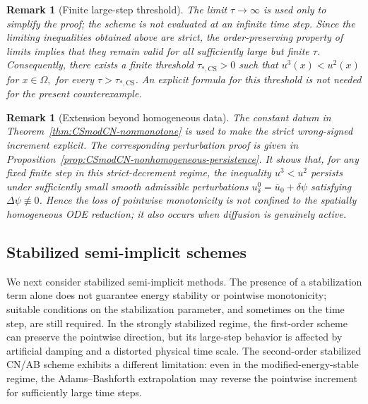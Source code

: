 \documentclass[final, 3p, times]{elsarticle}%
\newtheorem{remark}[theorem]{Remark}
\begin{document}
\begin{remark}[Finite large-step threshold]
The limit $\tau\to\infty$ is used only to simplify the proof; the scheme is
not evaluated at an infinite time step. Since the limiting inequalities
obtained above are strict, the order-preserving property of limits implies
that they remain valid for all sufficiently large but finite $\tau$.
Consequently, there exists a finite threshold
$\tau_{*,\mathrm{CS}}>0$ such that
\(u^3(x)<u^2(x)\) for \(x\in\Omega,\)
for every $\tau>\tau_{*,\mathrm{CS}}$. An explicit formula for this
threshold is not needed for the present counterexample.
\end{remark}
\begin{remark}[Extension beyond homogeneous data]
The constant datum in Theorem~\ref{thm:CSmodCN-nonmonotone} is used to
make the strict wrong-signed increment explicit. The corresponding
perturbation proof is given in Proposition~\ref{prop:CSmodCN-nonhomogeneous-persistence}. It shows that, for any
fixed finite step in this strict-decrement regime, the inequality
\(u^3<u^2\) persists under sufficiently small smooth admissible
perturbations \(u^0_\delta=\overline u_0+\delta\psi\) satisfying
\(\Delta\psi\not\equiv0\). Hence the loss of pointwise monotonicity is not
confined to the spatially homogeneous ODE reduction; it also occurs when
diffusion is genuinely active.
\end{remark}

\subsection{Stabilized semi-implicit schemes}
\label{sec:stabilized}

We next consider stabilized semi-implicit methods. The presence of a
stabilization term alone does not guarantee energy stability or
pointwise monotonicity; suitable conditions on the stabilization
parameter, and sometimes on the time step, are still required. In the
strongly stabilized regime, the first-order scheme can preserve the
pointwise direction, but its large-step behavior is affected by
artificial damping and a distorted physical time scale. The
second-order stabilized CN/AB scheme exhibits a different limitation:
even in the modified-energy-stable regime, the Adams--Bashforth
extrapolation may reverse the pointwise increment for sufficiently
large time steps.

\end{document}
